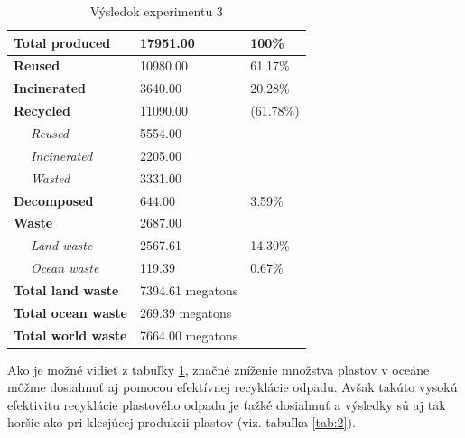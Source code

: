 \documentclass[a4paper, 11pt]{article}
\begin{document}
\begin{table}[ht]
	\centering
	\begin{tabular}{|l|l|l|l|}
		\hline
		\multicolumn{2}{|l|}{\textbf{Total produced}}    & 17951.00             & 100\%               \\ \hline
		\multicolumn{2}{|l|}{\textbf{Reused}}            & 10980.00             & 61.17\%             \\ \hline
		\multicolumn{2}{|l|}{\textbf{Incinerated}}       & 3640.00              & 20.28\%             \\ \hline
		\multicolumn{2}{|l|}{\textbf{Recycled}}          & 11090.00             & (61.78\%)           \\ \hline
		                                                 & \textit{Reused}      & 5554.00   &         \\ \hline
		                                                 & \textit{Incinerated} & 2205.00   &         \\ \hline
		                                                 & \textit{Wasted}      & 3331.00   &         \\ \hline
		\multicolumn{2}{|l|}{\textbf{Decomposed}}        & 644.00               & 3.59\%              \\ \hline
		\multicolumn{2}{|l|}{\textbf{Waste}}             & 2687.00              &                     \\ \hline
		                                                 & \textit{Land waste}  & 2567.61   & 14.30\% \\ \hline
		                                                 & \textit{Ocean waste} & 119.39    & 0.67\%  \\ \hline
		\multicolumn{2}{|l|}{\textbf{Total land waste}}  & 7394.61 megatons     &                     \\ \hline
		\multicolumn{2}{|l|}{\textbf{Total ocean waste}} & 269.39 megatons      &                     \\ \hline
		\multicolumn{2}{|l|}{\textbf{Total world waste}} & 7664.00 megatons     &                     \\ \hline
	\end{tabular}
	\caption{Výsledok experimentu 3}
	\label{tab:5}
\end{table}

Ako je možné vidieť z tabuľky \ref{tab:5}, značné zníženie množstva plastov v oceáne môžme dosiahnuť aj pomocou efektívnej recyklácie odpadu. Avšak takúto vysokú efektivitu recyklácie plastového odpadu je ťažké dosiahnuť a výsledky sú aj tak horšie ako pri klesjúcej produkcii plastov (viz. tabuľka \ref{tab:2}).
\end{document}
